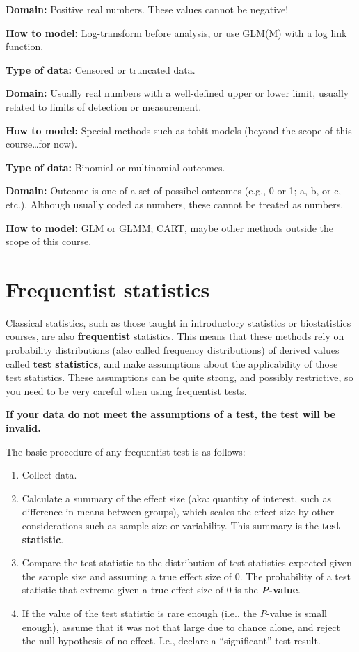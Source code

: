 \documentclass[
  13,
  letterpaper,
]{report}
\providecommand{\tightlist}{%
  \setlength{\itemsep}{0pt}\setlength{\parskip}{0pt}}
\begin{document}
\textbf{Domain:} Positive real numbers. These values cannot be negative!

\textbf{How to model:} Log-transform before analysis, or use GLM(M) with
a log link function.

\textbf{Type of data:} Censored or truncated data.

\textbf{Domain:} Usually real numbers with a well-defined upper or lower
limit, usually related to limits of detection or measurement.

\textbf{How to model:} Special methods such as tobit models (beyond the
scope of this course\ldots for now).

\textbf{Type of data:} Binomial or multinomial outcomes.

\textbf{Domain:} Outcome is one of a set of possibel outcomes (e.g., 0
or 1; a, b, or c, etc.). Although usually coded as numbers, these cannot
be treated as numbers.

\textbf{How to model:} GLM or GLMM; CART, maybe other methods outside
the scope of this course.

\section{Frequentist statistics}\label{mod-09-frequentist}

Classical statistics, such as those taught in introductory statistics or
biostatistics courses, are also \textbf{frequentist} statistics. This
means that these methods rely on probability distributions (also called
frequency distributions) of derived values called \textbf{test
statistics}, and make assumptions about the applicability of those test
statistics. These assumptions can be quite strong, and possibly
restrictive, so you need to be very careful when using frequentist
tests.

\textbf{If your data do not meet the assumptions of a test, the test
will be invalid.}

The basic procedure of any frequentist test is as follows:

\begin{enumerate}
\def\labelenumi{\arabic{enumi}.}
\tightlist
\item
  Collect data.
\item
  Calculate a summary of the effect size (aka: quantity of interest,
  such as difference in means between groups), which scales the effect
  size by other considerations such as sample size or variability. This
  summary is the \textbf{test statistic}.
\item
  Compare the test statistic to the distribution of test statistics
  expected given the sample size and assuming a true effect size of 0.
  The probability of a test statistic that extreme given a true effect
  size of 0 is the \textbf{\emph{P}-value}.
\item
  If the value of the test statistic is rare enough (i.e., the
  \emph{P}-value is small enough), assume that it was not that large due
  to chance alone, and reject the null hypothesis of no effect. I.e.,
  declare a ``significant'' test result.
\end{enumerate}
\end{document}
